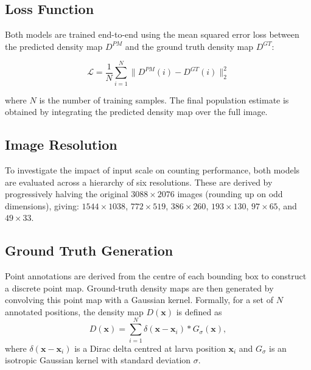 \documentclass[conference]{IEEEtran}
\begin{document}
\subsection{Loss Function}
Both models are trained end-to-end using the mean squared error loss between the predicted density map $D^{PM}$ and the ground truth density map $D^{GT}$:

\begin{equation}
    \mathcal{L} = \frac{1}{N} \sum_{i=1}^{N} \| D^{PM}(i) - D^{GT}(i) \|_2^2
\end{equation}

where $N$ is the number of training samples. The final population estimate is obtained by integrating the predicted density map over the full image. \cite{wang2020mobilecount, li2018csrnet}

\subsection{Image Resolution}
To investigate the impact of input scale on counting performance, both models are evaluated across a hierarchy of six resolutions. These are derived by progressively halving the original $3088 \times 2076$ images (rounding up on odd dimensions), giving: $1544 \times 1038$, $772 \times 519$, $386 \times 260$, $193 \times 130$, $97 \times 65$, and $49 \times 33$.

\subsection{Ground Truth Generation}
Point annotations are derived from the centre of each bounding box to construct
a discrete point map. Ground-truth density maps are then generated by convolving
this point map with a Gaussian kernel. Formally, for a set of $N$ annotated
positions, the density map $D(\mathbf{x})$ is defined as
\begin{equation}
    D(\mathbf{x}) = \sum_{i=1}^{N} \delta(\mathbf{x} - \mathbf{x}_i) *
    G_{\sigma}(\mathbf{x}),
\end{equation}
where $\delta(\mathbf{x} - \mathbf{x}_i)$ is a Dirac delta centred at larva
position $\mathbf{x}_i$ and $G_{\sigma}$ is an isotropic Gaussian kernel with
standard deviation $\sigma$.
\end{document}
